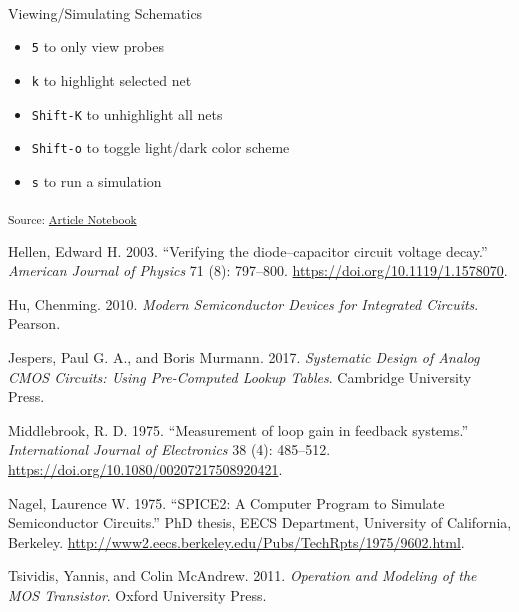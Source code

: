 \documentclass[
  a4paper,
  DIV=11,
  numbers=noendperiod]{scrartcl}
\makeatletter
\let\oldparagraph\paragraph
\renewcommand{\paragraph}{
    \@ifstar
      \xxxParagraphStar
      \xxxParagraphNoStar
  }
\newcommand{\xxxParagraphStar}[1]{\oldparagraph*{#1}\mbox{}}
\newcommand{\xxxParagraphNoStar}[1]{\oldparagraph{#1}\mbox{}}
\providecommand{\tightlist}{%
  \setlength{\itemsep}{0pt}\setlength{\parskip}{0pt}}\usepackage{longtable,booktabs,array}
\newlength{\cslhangindent}
\newenvironment{CSLReferences}[2] %
 {\begin{list}{}{%
  \setlength{\itemindent}{0pt}
  \setlength{\leftmargin}{0pt}
  \setlength{\parsep}{0pt}
  \ifodd #1
   \setlength{\leftmargin}{\cslhangindent}
   \setlength{\itemindent}{-1\cslhangindent}
  \fi
  \setlength{\itemsep}{#2\baselineskip}}}
 {\end{list}}
\makeatother
\begin{document}
\paragraph{Viewing/Simulating
Schematics}\label{viewingsimulating-schematics}

\begin{itemize}
\tightlist
\item
  \texttt{5} to only view probes
\item
  \texttt{k} to highlight selected net
\item
  \texttt{Shift-K} to unhighlight all nets
\item
  \texttt{Shift-o} to toggle light/dark color scheme
\item
  \texttt{s} to run a simulation
\end{itemize}

\textsubscript{Source:
\href{https://iic-jku.github.io/analog-circuit-design/index.qmd.html}{Article
Notebook}}

\label{refs}
\begin{CSLReferences}{1}{0}
Hellen, Edward H. 2003. {``{Verifying the diode--capacitor circuit
voltage decay}.''} \emph{American Journal of Physics} 71 (8): 797--800.
\url{https://doi.org/10.1119/1.1578070}.

Hu, Chenming. 2010. \emph{Modern Semiconductor Devices for Integrated
Circuits}. Pearson.

Jespers, Paul G. A., and Boris Murmann. 2017. \emph{Systematic Design of
Analog CMOS Circuits: Using Pre-Computed Lookup Tables}. Cambridge
University Press.

Middlebrook, R. D. 1975. {``{Measurement of loop gain in feedback
systems}.''} \emph{International Journal of Electronics} 38 (4):
485--512. \url{https://doi.org/10.1080/00207217508920421}.

Nagel, Laurence W. 1975. {``SPICE2: A Computer Program to Simulate
Semiconductor Circuits.''} PhD thesis, EECS Department, University of
California, Berkeley.
\url{http://www2.eecs.berkeley.edu/Pubs/TechRpts/1975/9602.html}.

Tsividis, Yannis, and Colin McAndrew. 2011. \emph{Operation and Modeling
of the MOS Transistor}. Oxford University Press.

\end{CSLReferences}
\end{document}
